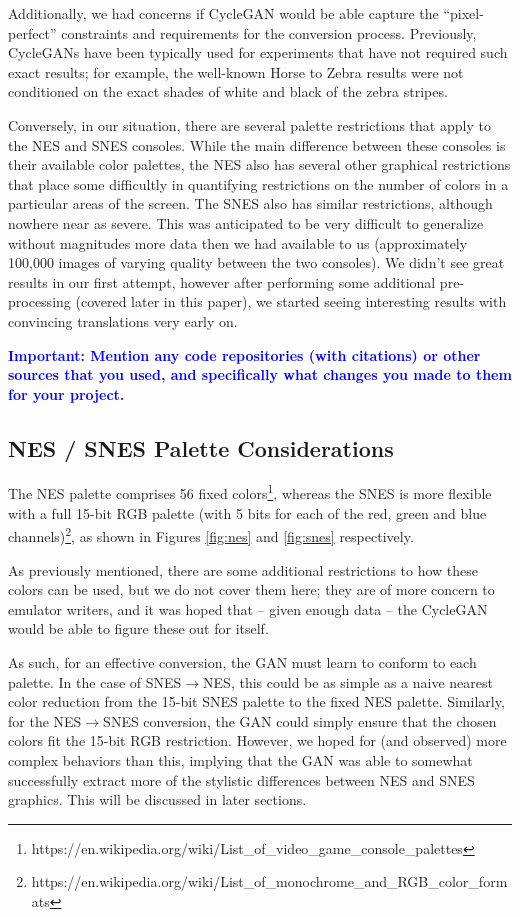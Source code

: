 \documentclass[10pt,twocolumn,letterpaper]{article}
\begin{document}
Additionally, we had concerns if CycleGAN would be able capture the ``pixel-perfect'' constraints and requirements for the conversion process. Previously, CycleGANs have been typically used for experiments that have not required such exact results; for example, the well-known Horse to Zebra results were not conditioned on the exact shades of white and black of the zebra stripes.

Conversely, in our situation, there are several palette restrictions that apply to the NES and SNES consoles. While the main difference between these consoles is their available color palettes, the NES also has several other graphical restrictions that place some difficultly in quantifying restrictions on the number of colors in a particular areas of the screen. The SNES also has similar restrictions, although nowhere near as severe. This was anticipated to be very difficult to generalize without magnitudes more data then we had available to us (approximately 100,000 images of varying quality between the two consoles). We didn't see great results in our first attempt, however after performing some additional pre-processing (covered later in this paper), we started seeing interesting results with convincing translations very early on.

\textbf{\textcolor{blue}{Important: Mention any code repositories (with citations) or other sources that you used, and specifically what changes you made to them for your project.}}

\subsection{NES / SNES Palette Considerations}
The NES palette comprises 56 fixed colors\footnote{https://en.wikipedia.org/wiki/List\_of\_video\_game\_console\_palettes}, whereas the SNES is more flexible with a full 15-bit RGB palette (with 5 bits for each of the red, green and blue channels)\footnote{https://en.wikipedia.org/wiki/List\_of\_monochrome\_and\_RGB\_color\_formats}, as shown in Figures \ref{fig:nes} and \ref{fig:snes} respectively.

As previously mentioned, there are some additional restrictions to how these colors can be used, but we do not cover them here; they are of more concern to emulator writers, and it was hoped that \--- given enough data \--- the CycleGAN would be able to figure these out for itself.

As such, for an effective conversion, the GAN must learn to conform to each palette. In the case of SNES${\rightarrow}$NES, this could be as simple as a naive nearest color reduction from the 15-bit SNES palette to the fixed NES palette. Similarly, for the NES${\rightarrow}$SNES conversion, the GAN could simply ensure that the chosen colors fit the 15-bit RGB restriction. However, we hoped for (and observed) more complex behaviors than this, implying that the GAN was able to somewhat successfully extract more of the stylistic differences between NES and SNES graphics. This will be discussed in later sections.
\end{document}
